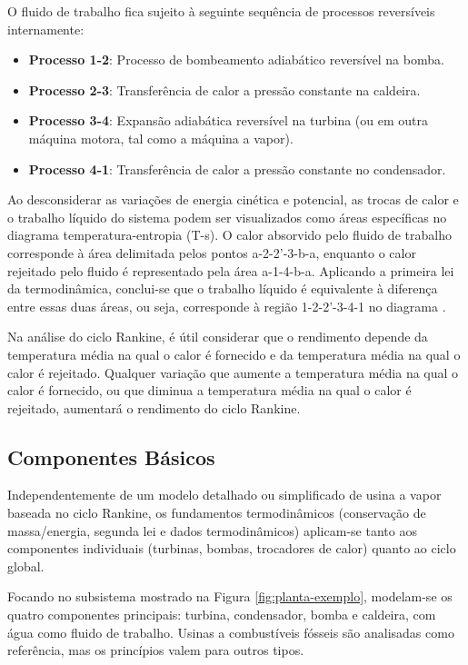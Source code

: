 \documentclass[
	article,			%
	11pt,				%
	oneside,			%
	a4paper,			%
	english,			%
	brazil,				%
	sumario=tradicional
	]{abntex2}
\begin{document}
O fluido de trabalho fica sujeito à seguinte sequência de processos reversíveis internamente: \cite{borgnakke-2020}

\begin{itemize}
	\item \textbf{Processo 1-2}: Processo de bombeamento adiabático reversível na bomba.
	\item \textbf{Processo 2-3}: Transferência de calor a pressão constante na caldeira.
	\item \textbf{Processo 3-4}: Expansão adiabática reversível na turbina (ou em outra máquina motora, tal como a máquina a vapor).
	\item \textbf{Processo 4-1}: Transferência de calor a pressão constante no condensador.
\end{itemize}

Ao desconsiderar as variações de energia cinética e potencial, as trocas de calor e o trabalho líquido do sistema podem ser visualizados como áreas específicas no diagrama temperatura-entropia (T-s). O calor absorvido pelo fluido de trabalho corresponde à área delimitada pelos pontos a-2-2'-3-b-a, enquanto o calor rejeitado pelo fluido é representado pela área a-1-4-b-a. Aplicando a primeira lei da termodinâmica, conclui-se que o trabalho líquido é equivalente à diferença entre essas duas áreas, ou seja, corresponde à região 1-2-2'-3-4-1 no diagrama \cite{borgnakke-2020}.

Na análise do ciclo Rankine, é útil considerar que o rendimento depende da temperatura média na qual o calor é fornecido e da temperatura média na qual o calor é rejeitado. Qualquer variação que aumente a temperatura média na qual o calor é fornecido, ou que diminua a temperatura média na qual o calor é rejeitado, aumentará o rendimento do ciclo Rankine.

\subsection{Componentes Básicos}

Independentemente de um modelo detalhado ou simplificado de usina a vapor baseada no ciclo Rankine, os fundamentos termodinâmicos (conservação de massa/energia, segunda lei e dados termodinâmicos) aplicam-se tanto aos componentes individuais (turbinas, bombas, trocadores de calor) quanto ao ciclo global.

Focando no subsistema mostrado na Figura \ref{fig:planta-exemplo}, modelam-se os quatro componentes principais: turbina, condensador, bomba e caldeira, com água como fluido de trabalho. Usinas a combustíveis fósseis são analisadas como referência, mas os princípios valem para outros tipos.
\end{document}
